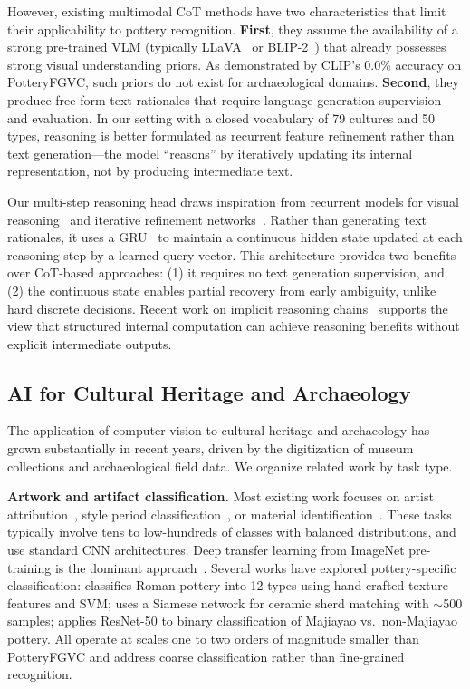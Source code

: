\documentclass[10pt,twocolumn,letterpaper]{article}
\begin{document}
However, existing multimodal CoT methods have two characteristics that limit their applicability to pottery recognition. \textbf{First}, they assume the availability of a strong pre-trained VLM (typically LLaVA~\cite{liu2024llava} or BLIP-2~\cite{li2023blip2}) that already possesses strong visual understanding priors. As demonstrated by CLIP's 0.0\% accuracy on PotteryFGVC, such priors do not exist for archaeological domains. \textbf{Second}, they produce free-form text rationales that require language generation supervision and evaluation. In our setting with a closed vocabulary of 79 cultures and 50 types, reasoning is better formulated as recurrent feature refinement rather than text generation---the model ``reasons'' by iteratively updating its internal representation, not by producing intermediate text.

Our multi-step reasoning head draws inspiration from recurrent models for visual reasoning~\cite{reasearch_recurrent} and iterative refinement networks~\cite{teerawat2022iterative}. Rather than generating text rationales, it uses a GRU~\cite{cho2014learning} to maintain a continuous hidden state updated at each reasoning step by a learned query vector. This architecture provides two benefits over CoT-based approaches: (1) it requires no text generation supervision, and (2) the continuous state enables partial recovery from early ambiguity, unlike hard discrete decisions. Recent work on implicit reasoning chains~\cite{deng2023implicit} supports the view that structured internal computation can achieve reasoning benefits without explicit intermediate outputs.

\subsection{AI for Cultural Heritage and Archaeology}

The application of computer vision to cultural heritage and archaeology has grown substantially in recent years, driven by the digitization of museum collections and archaeological field data. We organize related work by task type.

\textbf{Artwork and artifact classification.} Most existing work focuses on artist attribution~\cite{van2020visual}, style period classification~\cite{elgammal2018picasso}, or material identification~\cite{cosovic2020deep}. These tasks typically involve tens to low-hundreds of classes with balanced distributions, and use standard CNN architectures. Deep transfer learning from ImageNet pre-training is the dominant approach~\cite{sabiescu2021transfer}. Several works have explored pottery-specific classification: \cite{chella2022} classifies Roman pottery into 12 types using hand-crafted texture features and SVM; \cite{gao2022ceramic} uses a Siamese network for ceramic sherd matching with $\sim$500 samples; \cite{liu2021pottery} applies ResNet-50 to binary classification of Majiayao vs.\ non-Majiayao pottery. All operate at scales one to two orders of magnitude smaller than PotteryFGVC and address coarse classification rather than fine-grained recognition.
\end{document}
